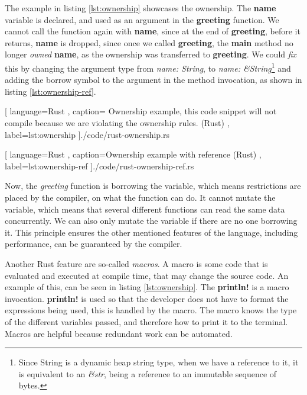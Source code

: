 The example in listing \ref{lst:ownership} showcases the ownership. The
\textbf{name} variable is declared, and used as an argument in the
\textbf{greeting} function. We cannot call the function again with
\textbf{name}, since at the end of \textbf{greeting}, before it returns,
\textbf{name} is dropped, since once we called \textbf{greeting}, the
\textbf{main} method no longer \textit{owned} \textbf{name}, as the ownership
was transferred to \textbf{greeting}. We could \textit{fix} this by changing the
argument type from \textit{name: String}, to \textit{name: \&String}\footnote{Since String is a dynamic heap string type, when we have a reference to it, it is equivalent to an \textit{\&str}, being a reference to an immutable sequence of bytes.}
and adding the borrow symbol to the argument in
the method invocation, as shown in listing \ref{lst:ownership-ref}.

\begin{code}[H]
  
    [ language=Rust
    , caption={
      Ownership example, this code snippet will not compile because we are
      violating the ownership rules. (Rust)
    }
    , label=lst:ownership
    ]{./code/rust-ownership.rs}
\end{code}

\begin{code}[H]
  
    [ language=Rust
    , caption={Ownership example with reference (Rust)}
    , label=lst:ownership-ref
    ]{./code/rust-ownership-ref.rs}
\end{code}

Now, the \textit{greeting} function is borrowing the variable, which means
restrictions are placed by the compiler, on what the function can do. It cannot
mutate the variable, which means that several different functions can read the
same data concurrently. We can also only mutate the variable if there are no one
borrowing it. This principle ensures the other mentioned features of the
language, including performance, can be guaranteed by the compiler.

Another Rust feature are so-called \textit{macros}. A macro is some code that is
evaluated and executed at compile time, that may change the source code. An
example of this, can be seen in listing \ref{lst:ownership}. The
\textbf{println!} is a macro invocation. \textbf{println!} is used so that the
developer does not have to format the expressions being used, this is handled by
the macro. The macro knows the type of the different variables passed, and
therefore how to print it to the terminal. Macros are helpful because redundant
work can be automated.

